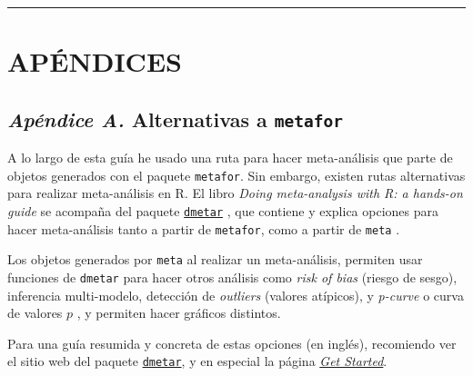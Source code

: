 \documentclass[
  bookmarksnumbered]{article}
\begin{document}
\begin{multicols}{2}
\AtNextBibliography{\footnotesize}
\printbibliography[heading=none]
\normalsize
\end{multicols}

\def\printbibliography{}

\begin{center}\rule{0.5\linewidth}{0.5pt}\end{center}

\hypertarget{apuxe9ndices}{%
\section*{APÉNDICES}\label{apuxe9ndices}}

\hypertarget{appendix-apuxe9ndice}{%
\appendix}


\setcounter{table}{0} \renewcommand{\thetable}{A\arabic{table}} \setcounter{figure}{0} \renewcommand{\thefigure}{A\arabic{figure}}

\hypertarget{apendice-alt}{%
\subsection*{\texorpdfstring{\emph{Apéndice A.} Alternativas a \texttt{metafor}}{Apéndice A. Alternativas a metafor}}\label{apendice-alt}}

A lo largo de esta guía he usado una ruta para hacer meta-análisis que parte de objetos generados con el paquete \texttt{metafor}. Sin embargo, existen rutas alternativas para realizar meta-análisis en R. El libro \emph{Doing meta-analysis with R: a hands-on guide} \autocite{harrer2021doing} se acompaña del paquete \href{https://dmetar.protectlab.org/index.html}{\texttt{dmetar}} \autocite{Harrer2019dmetar}, que contiene y explica opciones para hacer meta-análisis tanto a partir de \texttt{metafor}, como a partir de \texttt{meta} \autocite{BalduzziMeta2019,schwarzerMetaAnalysis2015}.

Los objetos generados por \texttt{meta} al realizar un meta-análisis, permiten usar funciones de \texttt{dmetar} para hacer otros análisis como \emph{risk of bias} (riesgo de sesgo), inferencia multi-modelo, detección de \emph{outliers} (valores atípicos), y \emph{p-curve} o curva de valores \(p\) \autocites[e.g.,][]{simonsohnPCurveEffectSize2014,simonsohnPcurveWonYour2019}, y permiten hacer gráficos distintos.

Para una guía resumida y concreta de estas opciones (en inglés), recomiendo ver el sitio web del paquete \href{http://dmetar.protectlab.org/}{\texttt{dmetar}}, y en especial la página \href{https://dmetar.protectlab.org/articles/dmetar.html}{\emph{Get Started}}.
\end{document}
